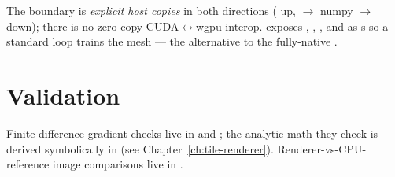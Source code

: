 The boundary is \emph{explicit host copies} in both directions
( up,  $\to$ numpy
$\to$  down); there is no zero-copy
CUDA$\leftrightarrow$wgpu interop.  exposes
, , , and
 as s so a standard
 loop trains the mesh --- the
alternative to the fully-native .

\section{Validation}

Finite-difference gradient checks live in
 and
; the analytic math they
check is derived symbolically in 
(see Chapter~\ref{ch:tile-renderer}). Renderer-vs-CPU-reference image comparisons
live in .

